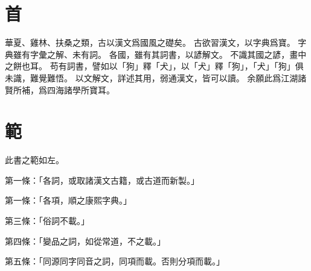 \section{首}
華夏、雞林、扶桑之類，古以漢文爲國風之礎矣。
古欲習漢文，以字典爲寶。
字典雖有字彙之解、未有詞。
各國，雖有其詞書，以諺解文。
不識其國之諺，畫中之餅也耳。
苟有詞書，譬如以「狗」釋「犬」，以「犬」釋「狗」，「犬」「狗」俱未識，難覺難悟。
以文解文，詳述其用，弱通漢文，皆可以讀。
余願此爲江湖諸賢所補，爲四海諸學所寶耳。
\section{範}
此書之範如左。
\par 第一條：「各詞，或取諸漢文古籍，或古道而新製。」
\par 第一條：「各項，順之康熙字典。」
\par 第三條：「俗詞不載。」
\par 第四條：「變品之詞，如從常道，不之載。」
\par 第五條：「同源同字同音之詞，同項而載。否則分項而載。」
